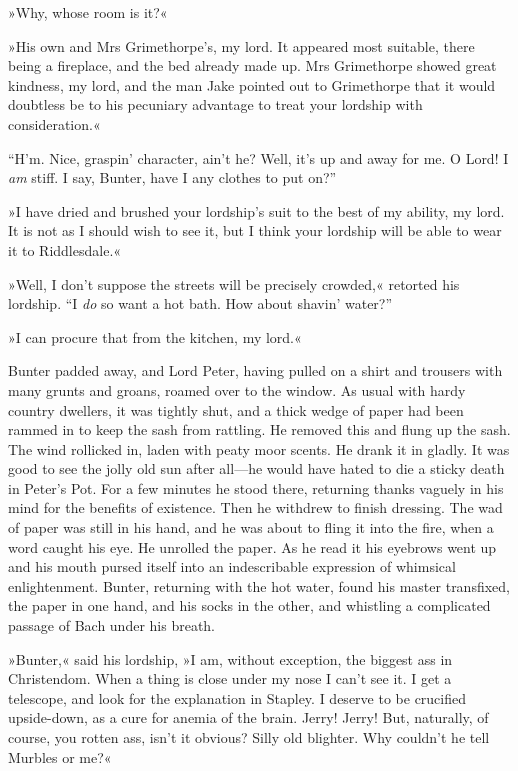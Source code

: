 »Why, whose room is it?«

»His own and Mrs Grimethorpe's, my lord. It appeared most suitable, there being a fireplace, and the bed already made up. Mrs Grimethorpe showed great kindness, my lord, and the man Jake pointed out to Grimethorpe that it would doubtless be to his pecuniary advantage to treat your lordship with consideration.«

\enquote{H'm. Nice, graspin' character, ain't he? Well, it's up and away for me. O Lord! I \textit{am} stiff. I say, Bunter, have I any clothes to put on?}

»I have dried and brushed your lordship's suit to the best of my ability, my lord. It is not as I should wish to see it, but I think your lordship will be able to wear it to Riddlesdale.«

»Well, I don't suppose the streets will be precisely crowded,« retorted his lordship. \enquote{I \textit{do} so want a hot bath. How about shavin' water?}

»I can procure that from the kitchen, my lord.«

Bunter padded away, and Lord Peter, having pulled on a shirt and trousers with many grunts and groans, roamed over to the window. As usual with hardy country dwellers, it was tightly shut, and a thick wedge of paper had been rammed in to keep the sash from rattling. He removed this and flung up the sash. The wind rollicked in, laden with peaty moor scents. He drank it in gladly. It was good to see the jolly old sun after all\allowbreak---\allowbreak he would have hated to die a sticky death in Peter's Pot. For a few minutes he stood there, returning thanks vaguely in his mind for the benefits of existence. Then he withdrew to finish dressing. The wad of paper was still in his hand, and he was about to fling it into the fire, when a word caught his eye. He unrolled the paper. As he read it his eyebrows went up and his mouth pursed itself into an indescribable expression of whimsical enlightenment. Bunter, returning with the hot water, found his master transfixed, the paper in one hand, and his socks in the other, and whistling a complicated passage of Bach under his breath.

»Bunter,« said his lordship, »I am, without exception, the biggest ass in Christendom. When a thing is close under my nose I can't see it. I get a telescope, and look for the explanation in Stapley. I deserve to be crucified upside-down, as a cure for anemia of the brain. Jerry!  Jerry! But, naturally, of course, you rotten ass, isn't it obvious?  Silly old blighter. Why couldn't he tell Murbles or me?«


